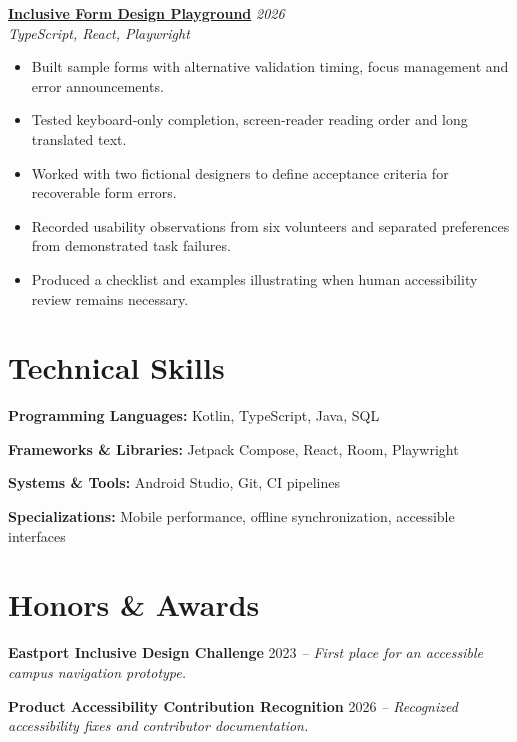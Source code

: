\documentclass[11pt,a4paper]{article}
\begin{document}
\textbf{\href{https://example.com/demos/inclusive-form-design-playground}{Inclusive Form Design Playground}} \hfill \textit{2026}\\
\textit{TypeScript, React, Playwright}
\begin{itemize}[leftmargin=*,noitemsep,topsep=2pt]
\item Built sample forms with alternative validation timing, focus management and error announcements.
\item Tested keyboard-only completion, screen-reader reading order and long translated text.
\item Worked with two fictional designers to define acceptance criteria for recoverable form errors.
\item Recorded usability observations from six volunteers and separated preferences from demonstrated task failures.
\item Produced a checklist and examples illustrating when human accessibility review remains necessary.
\end{itemize}

\section{Technical Skills}
\textbf{Programming Languages:} Kotlin, TypeScript, Java, SQL

\textbf{Frameworks \& Libraries:} Jetpack Compose, React, Room, Playwright

\textbf{Systems \& Tools:} Android Studio, Git, CI pipelines

\textbf{Specializations:} Mobile performance, offline synchronization, accessible interfaces

\section{Honors \& Awards}
\textbf{Eastport Inclusive Design Challenge} \hfill 2023 \textit{-- First place for an accessible campus navigation prototype.}

\textbf{Product Accessibility Contribution Recognition} \hfill 2026 \textit{-- Recognized accessibility fixes and contributor documentation.}
\end{document}
